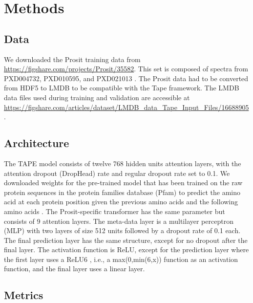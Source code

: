 \documentclass[10pt,a4paper]{article}
\begin{document}
\section*{Methods}
\subsection*{Data}
We downloaded the Prosit training data from \url{https://figshare.com/projects/Prosit/35582}.  This set is composed of spectra from PXD004732, PXD010595, and PXD021013 \cite{Gessulat2019-el, Wilhelm2021-mz}. The Prosit data had to be converted from HDF5 to LMDB to be compatible with the Tape framework. The LMDB data files used during training and validation are accessible at \url{https://figshare.com/articles/dataset/LMDB_data_Tape_Input_Files/16688905}.

\subsection*{Architecture}

The TAPE model consists of twelve 768 hidden units attention layers, with the attention dropout (DropHead) rate \cite{Zhou2020-ji} and regular dropout rate set to 0.1. We downloaded weights for the pre-trained model that has been trained on the raw protein sequences in the protein families database (Pfam) to predict the amino acid at each protein position given the previous amino acids and the following amino acids \cite{Rao2019-qq}. The Prosit-specific transformer has the same parameter but consists of 9 attention layers. The meta-data layer is a multilayer perceptron (MLP) with two layers of size 512 units followed by a dropout rate of 0.1 each. The final prediction layer has the same structure, except for no dropout after the final layer.  The activation function is ReLU, except for the prediction layer where the first layer uses a ReLU6 \cite{Howard2017-yv}, i.e., a max(0,min(6,x)) function as an activation function, and the final layer uses a linear layer.

\subsection*{Metrics}
\end{document}
